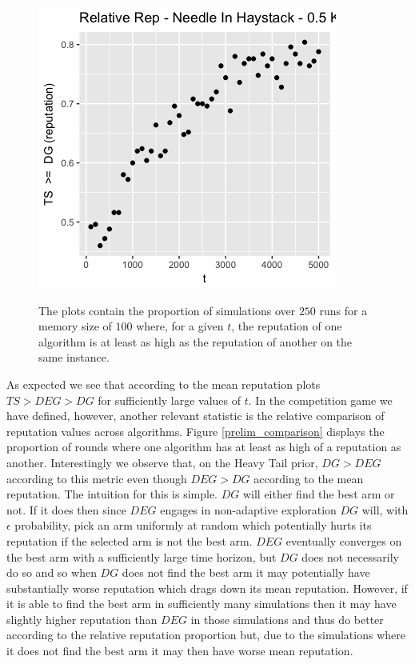 \documentclass{article}
\theoremstyle{definition}
\begin{document}
\begin{figure}
\includegraphics[scale=0.25]{"figures/ts_dg_nih_10_prelim"} \\
\caption*{\tiny{The plots contain the proportion of simulations over $250$ runs for a memory size of $100$ where, for a given $t$, the reputation of one algorithm is at least as high as the reputation of another on the same instance.}}
\label{relative_rep}
\end{figure}


As expected we see that according to the mean reputation plots $TS > DEG > DG$ for sufficiently large values of $t$. In the competition game we have defined, however, another relevant statistic is the relative comparison of reputation values across algorithms. Figure \ref{prelim_comparison} displays the proportion of rounds where one algorithm has at least as high of a reputation as another. Interestingly we observe that, on the Heavy Tail prior, $DG > DEG$ according to this metric even though $DEG > DG$ according to the mean reputation. The intuition for this is simple. $DG$ will either find the best arm or not. If it does then since $DEG$ engages in non-adaptive exploration $DG$ will, with $\epsilon$ probability, pick an arm uniformly at random which potentially hurts its reputation if the selected arm is not the best arm. $DEG$ eventually converges on the best arm with a sufficiently large time horizon, but $DG$ does not necessarily do so and so when $DG$ does not find the best arm it may potentially have substantially worse reputation which drags down its mean reputation. However, if it is able to find the best arm in sufficiently many simulations then it may have slightly higher reputation than $DEG$ in those simulations and thus do better according to the relative reputation proportion but, due to the simulations where it does not find the best arm it may then have worse mean reputation.
\end{document}

